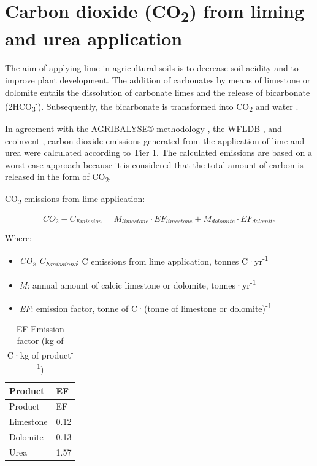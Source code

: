 \documentclass[openany]{book}
\begin{document}
\hypertarget{carbon-dioxide-co2-from-liming-and-urea-application}{%
\section{\texorpdfstring{Carbon dioxide (CO\textsubscript{2}) from liming and urea application}{Carbon dioxide (CO2) from liming and urea application}}\label{carbon-dioxide-co2-from-liming-and-urea-application}}

The aim of applying lime in agricultural soils is to decrease soil acidity and to improve plant development. The addition of carbonates by means of limestone or dolomite entails the dissolution of carbonate limes and the release of bicarbonate (2HCO\textsubscript{3}\textsuperscript{-}). Subsequently, the bicarbonate is transformed into CO\textsubscript{2} and water \citep{IPCC2006}.

In agreement with the AGRIBALYSE® methodology \citep{Koch2015}, the WFLDB \citep{nemecek2014}, and ecoinvent \citep{nemecek2011}, carbon dioxide emissions generated from the application of lime and urea were calculated according to \citet{IPCC2006} Tier 1. The calculated emissions are based on a worst-case approach because it is considered that the total amount of carbon is released in the form of CO\textsubscript{2}.

CO\textsubscript{2} emissions from lime application:

\[CO_2-C_{Emission}=M_{limestone} \cdot EF_{limestone} + M_{dolomite} \cdot EF_{dolomite}\]

Where:

\begin{itemize}
\item
  \emph{CO\textsubscript{2}-C\textsubscript{Emissions}}: C emissions from lime application, tonnes C·yr\textsuperscript{-1}
\item
  \emph{M}: annual amount of calcic limestone or dolomite, tonnes·yr\textsuperscript{-1}
\item
  \emph{EF}: emission factor, tonne of C·(tonne of limestone or dolomite)\textsuperscript{-1}
\end{itemize}

\begin{longtable}[]{@{}ll@{}}
\caption{\label{tab:carbon-dioxide-ef} EF-Emission factor (kg of C·kg of product\textsuperscript{-1})}\tabularnewline
\toprule
Product & EF\tabularnewline
\midrule
\endfirsthead
\toprule
Product & EF\tabularnewline
\midrule
\endhead
Limestone & 0.12\tabularnewline
Dolomite & 0.13\tabularnewline
Urea & 1.57\tabularnewline
\bottomrule
\end{longtable}
\end{document}
